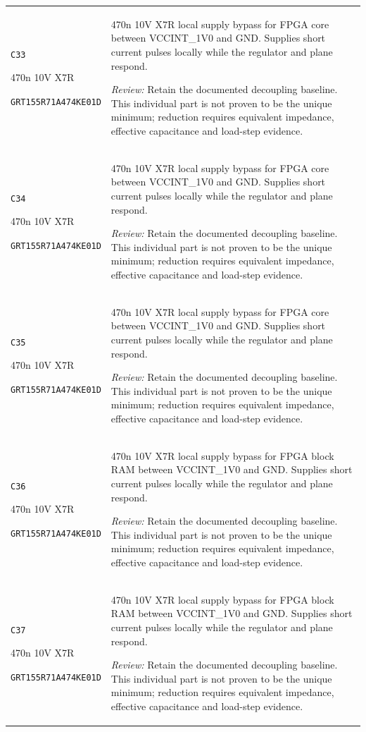 \documentclass[10pt,a4paper]{article}
\begin{document}
\begin{longtable}{@{}P{46mm}P{117mm}@{}}
\nolinkurl{C33}\par 470n 10V X7R\par\scriptsize \nolinkurl{GRT155R71A474KE01D} & 470n 10V X7R local supply bypass for FPGA core between VCCINT\_1V0 and GND. Supplies short current pulses locally while the regulator and plane respond.\par\smallskip\textit{Review:} Retain the documented decoupling baseline. This individual part is not proven to be the unique minimum; reduction requires equivalent impedance, effective capacitance and load-step evidence. \\
\nolinkurl{C34}\par 470n 10V X7R\par\scriptsize \nolinkurl{GRT155R71A474KE01D} & 470n 10V X7R local supply bypass for FPGA core between VCCINT\_1V0 and GND. Supplies short current pulses locally while the regulator and plane respond.\par\smallskip\textit{Review:} Retain the documented decoupling baseline. This individual part is not proven to be the unique minimum; reduction requires equivalent impedance, effective capacitance and load-step evidence. \\
\nolinkurl{C35}\par 470n 10V X7R\par\scriptsize \nolinkurl{GRT155R71A474KE01D} & 470n 10V X7R local supply bypass for FPGA core between VCCINT\_1V0 and GND. Supplies short current pulses locally while the regulator and plane respond.\par\smallskip\textit{Review:} Retain the documented decoupling baseline. This individual part is not proven to be the unique minimum; reduction requires equivalent impedance, effective capacitance and load-step evidence. \\
\nolinkurl{C36}\par 470n 10V X7R\par\scriptsize \nolinkurl{GRT155R71A474KE01D} & 470n 10V X7R local supply bypass for FPGA block RAM between VCCINT\_1V0 and GND. Supplies short current pulses locally while the regulator and plane respond.\par\smallskip\textit{Review:} Retain the documented decoupling baseline. This individual part is not proven to be the unique minimum; reduction requires equivalent impedance, effective capacitance and load-step evidence. \\
\nolinkurl{C37}\par 470n 10V X7R\par\scriptsize \nolinkurl{GRT155R71A474KE01D} & 470n 10V X7R local supply bypass for FPGA block RAM between VCCINT\_1V0 and GND. Supplies short current pulses locally while the regulator and plane respond.\par\smallskip\textit{Review:} Retain the documented decoupling baseline. This individual part is not proven to be the unique minimum; reduction requires equivalent impedance, effective capacitance and load-step evidence. \\

\end{longtable}
\end{document}
